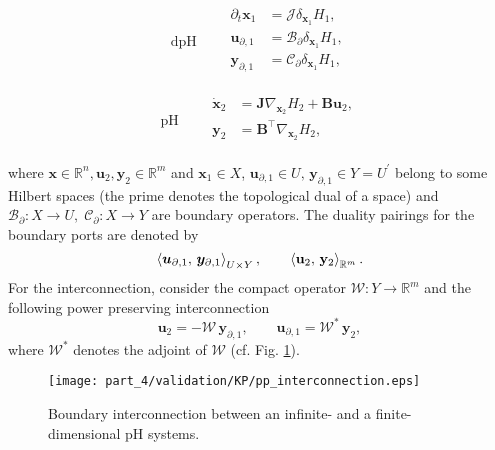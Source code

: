 \noindent
\begin{minipage}{.45\linewidth}
	\begin{equation}
	\text{dpH}\qquad
	\begin{aligned}
	\partial_t \bm{x}_1 &= \mathcal{J} \delta_{\bm{x}_1} {H_1}, \\
	\bm{u}_{\partial, 1}  &= \mathcal{B}_\partial \delta_{\bm{x}_1} {H_1}, \\
	\bm{y}_{\partial, 1} &= \mathcal{C}_\partial \delta_{\bm{x}_1} {H_1}, \\
	\end{aligned}
	\end{equation}
\end{minipage}
\begin{minipage}{.5\linewidth}
	\begin{equation}
	\text{pH} \qquad
	\begin{aligned}
	\dot{\mathbf{x}}_2 &= \mathbf{J} \nabla_{\mathbf{x}_2} {H_2} + \mathbf{B} \mathbf{u}_2, \\
	\mathbf{y}_{2} &= \mathbf{B}^\top \nabla_{\mathbf{x}_2} {H_2}, \\
	\end{aligned}
	\end{equation}
\end{minipage} %

where $\mathbf{x} \in \mathbb{R}^n, \mathbf{u}_2, \mathbf{y}_2 \in \mathbb{R}^m$ and $\bm{x}_1 \in {X}$,  $\bm{u}_{\partial, 1}  \in {U}, \, \bm{y}_{\partial, 1} \in  {Y} = {U}^\prime$ belong to some Hilbert spaces (the prime denotes the topological dual of a space)  and  $\mathcal{B}_\partial: {X} \rightarrow {U}, \; \mathcal{C}_\partial: {X} \rightarrow {Y}$ are boundary operators. The duality pairings for the boundary ports are denoted by
\[
\inner[{U} \times {Y}]{\bm{u}_{\partial, 1}}{\bm{y}_{\partial, 1}},  \qquad
\inner[\mathbb{R}^m]{\mathbf{u}_{2}}{\mathbf{y}_{2}}.
\]
For the interconnection, consider the compact operator $\mathcal{W}: Y \rightarrow \mathbb{R}^m$ and the following power preserving interconnection
\begin{equation}
\label{eq:int_inf}
\mathbf{u}_2 = -\mathcal{W} \, \bm{y}_{\partial, 1},  \qquad \bm{u}_{\partial, 1} = \mathcal{W}^* \, \mathbf{y}_2,
\end{equation}
where $\mathcal{W}^*$ denotes the adjoint of $\mathcal{W}$ (cf. Fig. \ref{fig:interconnection_dpH_pH}). 
\begin{figure}[tb]
	\centering
	\texttt{[image: part\_4/validation/KP/pp\_interconnection.eps]} 
	\caption{Boundary interconnection between an infinite- and a finite-dimensional pH systems.}
	\label{fig:interconnection_dpH_pH}
\end{figure}

